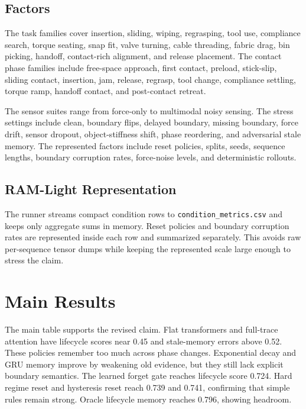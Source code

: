 \documentclass{article}
\begin{document}


\subsection{Factors}

The task families cover insertion, sliding, wiping, regrasping, tool use,
compliance search, torque seating, snap fit, valve turning, cable threading,
fabric drag, bin picking, handoff, contact-rich alignment, and release
placement. The contact phase families include free-space approach, first
contact, preload, stick-slip, sliding contact, insertion, jam, release, regrasp,
tool change, compliance settling, torque ramp, handoff contact, and post-contact
retreat.

The sensor suites range from force-only to multimodal noisy sensing. The stress
settings include clean, boundary flips, delayed boundary, missing boundary,
force drift, sensor dropout, object-stiffness shift, phase reordering, and
adversarial stale memory. The represented factors include reset policies,
splits, seeds, sequence lengths, boundary corruption rates, force-noise levels,
and deterministic rollouts.

\subsection{RAM-Light Representation}

The runner streams compact condition rows to \texttt{condition\_metrics.csv}
and keeps only aggregate sums in memory. Reset policies and boundary corruption
rates are represented inside each row and summarized separately. This avoids
raw per-sequence tensor dumps while keeping the represented scale large enough
to stress the claim.

\section{Main Results}



The main table supports the revised claim. Flat transformers and full-trace
attention have lifecycle scores near 0.45 and stale-memory errors above 0.52.
These policies remember too much across phase changes. Exponential decay and
GRU memory improve by weakening old evidence, but they still lack explicit
boundary semantics. The learned forget gate reaches lifecycle score 0.724. Hard
regime reset and hysteresis reset reach 0.739 and 0.741, confirming that simple
rules remain strong. Oracle lifecycle memory reaches 0.796, showing headroom.
\end{document}
